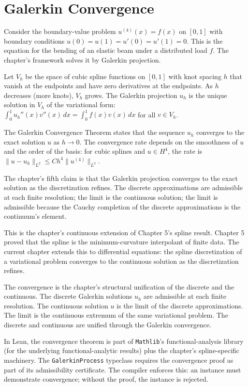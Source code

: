 \section{Galerkin Convergence}
\label{se:galerkin-convergence}

Consider the boundary-value problem $u^{(4)}(x) = f(x)$ on $[0, 1]$
with boundary conditions $u(0) = u(1) = u'(0) = u'(1) = 0$. This is
the equation for the bending of an elastic beam under a distributed
load $f$. The chapter's framework solves it by Galerkin projection.

Let $V_h$ be the space of cubic spline functions on $[0, 1]$ with
knot spacing $h$ that vanish at the endpoints and have zero
derivatives at the endpoints. As $h$ decreases (more knots), $V_h$
grows. The Galerkin projection $u_h$ is the unique solution in
$V_h$ of the variational form: $\int_0^1 u_h''(x) v''(x) \, dx =
\int_0^1 f(x) v(x) \, dx$ for all $v \in V_h$.

The Galerkin Convergence Theorem states that the sequence $u_h$
converges to the exact solution $u$ as $h \to 0$. The convergence
rate depends on the smoothness of $u$ and the order of the basis:
for cubic splines and $u \in H^4$, the rate is $\|u - u_h\|_{L^2}
\le C h^4 \|u^{(4)}\|_{L^2}$.

The chapter's fifth claim is that the Galerkin projection
converges to the exact solution as the discretization refines.
The discrete approximations are admissible at each finite
resolution; the limit is the continuous solution; the limit is
admissible because the Cauchy completion of the discrete
approximations is the continuum's element.

This is the chapter's continuous extension of Chapter 5's spline
result. Chapter 5 proved that the spline is the
minimum-curvature interpolant of finite data. The current
chapter extends this to differential equations: the spline
discretization of a variational problem converges to the
continuous solution as the discretization refines.

The convergence is the chapter's structural unification of the
discrete and the continuous. The discrete Galerkin solutions
$u_h$ are admissible at each finite resolution. The continuous
solution $u$ is the limit of the discrete approximations. The
limit is the continuous extremum of the same variational
problem. The discrete and continuous are unified through the
Galerkin convergence.

In Lean, the convergence theorem is part of \texttt{Mathlib}'s
functional-analysis library (for the underlying functional-analytic
results) plus the chapter's spline-specific machinery. The
\texttt{GalerkinProcess} typeclass requires the convergence proof
as part of its admissibility certificate. The compiler enforces
this: an instance must demonstrate convergence; without the
proof, the instance is rejected.

